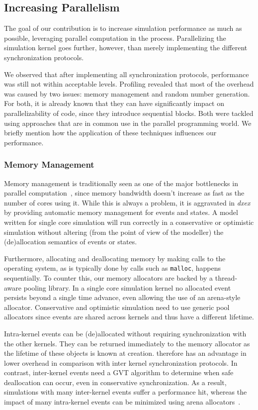 \subsection{Increasing Parallelism}
The goal of our contribution is to increase simulation performance as much as possible, leveraging parallel computation in the process.
Parallelizing the simulation kernel goes further, however, than merely implementing the different synchronization protocols.

We observed that after implementing all synchronization protocols, performance was still not within acceptable levels.
Profiling revealed that most of the overhead was caused by two issues: memory management and random number generation.
For both, it is already known that they can have significantly impact on parallelizability of code, since they introduce sequential blocks.
Both were tackled using approaches that are in common use in the parallel programming world.
We briefly mention how the application of these techniques influences our performance.

\subsubsection{Memory Management}
\label{sec:4-subsec:overhead-pgraph:memory}
Memory management is traditionally seen as one of the major bottlenecks in parallel computation~\cite{Memory}, since memory bandwidth doesn't increase as fast as the number of cores using it.
While this is always a problem, it is aggravated in \textit{dxex} by providing automatic memory management for events and states.
A model written for single core simulation will run correctly in a conservative or optimistic simulation without altering (from the point of view of the modeller) the (de)allocation semantics of events or states.

Furthermore, allocating and deallocating memory by making calls to the operating system, as is typically done by calls such as \texttt{malloc}, happens sequentially.
To counter this, our memory allocators are backed by a thread-aware pooling library.
In a single core simulation kernel no allocated event persists beyond a single time advance, even allowing the use of an arena-style allocator.
Conservative and optimistic simulation need to use generic pool allocators since events are shared across kernels and thus have a different lifetime.

Intra-kernel events can be (de)allocated without requiring synchronization with the other kernels. 
They can be returned immediately to the memory allocator as the lifetime of these objects is known at creation. 
\pSim therefore has an advantage in lower overhead in comparison with inter kernel synchronization protocols.
In contrast, inter-kernel events need a GVT algorithm to determine when safe deallocation can occur, even in conservative synchronization.
As a result, simulations with many inter-kernel events suffer a performance hit, whereas the impact of many intra-kernel events can be minimized using arena allocators~\cite{Arena}.

